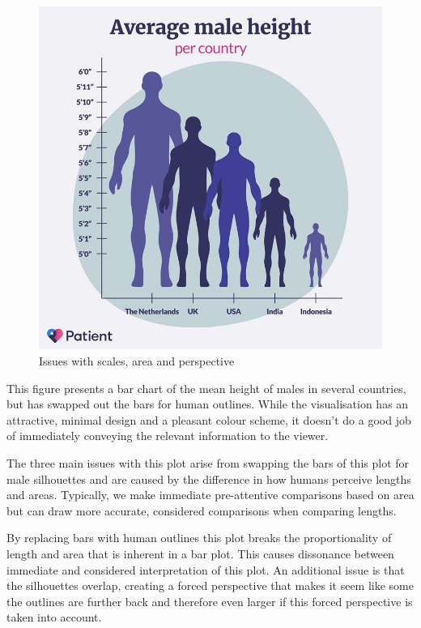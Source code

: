\documentclass[
  letterpaper,
  DIV=11,
  numbers=noendperiod]{scrreprt}
\begin{document}
\begin{figure}[H]

{\centering \includegraphics{images/303-data-visualisation/average-male-height.jpg}

}

\caption{Issues with scales, area and perspective}

\end{figure}%

This figure presents a bar chart of the mean height of males in several
countries, but has swapped out the bars for human outlines. While the
visualisation has an attractive, minimal design and a pleasant colour
scheme, it doesn't do a good job of immediately conveying the relevant
information to the viewer.

The three main issues with this plot arise from swapping the bars of
this plot for male silhouettes and are caused by the difference in how
humans perceive lengths and areas. Typically, we make immediate
pre-attentive comparisons based on area but can draw more accurate,
considered comparisons when comparing lengths.

By replacing bars with human outlines this plot breaks the
proportionality of length and area that is inherent in a bar plot. This
causes dissonance between immediate and considered interpretation of
this plot. An additional issue is that the silhouettes overlap, creating
a forced perspective that makes it seem like some the outlines are
further back and therefore even larger if this forced perspective is
taken into account.
\end{document}

